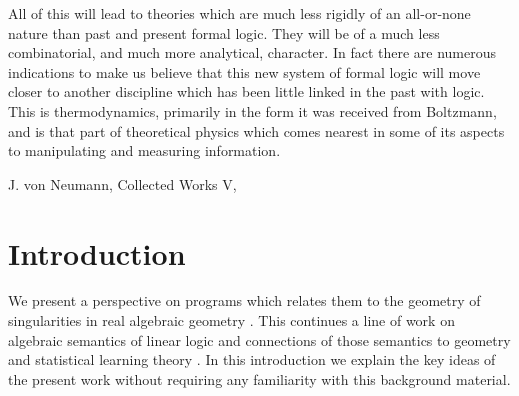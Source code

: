 \documentclass[english,letter paper,12pt,reqno]{article}
\theoremstyle{definition}
\begin{document}
\begin{abstract} We develop a correspondence between the structure of Turing machines and the structure of singularities of real analytic functions, based on connecting the Ehrhard-Regnier derivative from linear logic with the role of geometry in Watanabe's singular learning theory. The correspondence works by embedding ordinary (discrete) Turing machine codes into a family of ``noisy'' codes which form a smooth parameter space. On this parameter space we consider a potential function which has Turing machines as critical points. By relating the Taylor series expansion of this potential at such a critical point to combinatorics of error syndromes, we relate the local geometry to internal structure of the Turing machine.

The potential in question is the negative log-likelihood for a statistical model, so that the structure of the Turing machine and its associated singularity is further related to Bayesian inference. Two algorithms that produce the same predictive function can nonetheless correspond to singularities with different geometries, which implies that the Bayesian posterior can discriminate between distinct algorithmic implementations, contrary to a purely functional view of inference. In the context of singular learning theory our results point to a more nuanced understanding of Occam’s razor and the meaning of simplicity in inductive inference.
\end{abstract}

\setlength{\epigraphwidth}{0.7\textwidth}
\epigraph{All of this will lead to theories which are much less rigidly of an all-or-none nature than past and present formal logic. They will be of a much less combinatorial, and much more analytical, character. In fact there are numerous indications to make us believe that this new system of formal logic will move closer to another discipline which has been little linked in the past with logic. This is thermodynamics, primarily in the form it was received from Boltzmann, and is that part of theoretical physics which comes nearest in some of its aspects to manipulating and measuring information.}{J. von Neumann, Collected Works V, \cite[p. 304]{vonNeumann1963}}

\tableofcontents
\newpage

\section{Introduction}

We present a perspective on programs which relates them to the geometry of singularities in real algebraic geometry \cite{arnold1981singularity,greuel2007introduction,greuel2007singularity}. This continues a line of work on algebraic semantics of linear logic \cite{murfet2015sweedler,clift2020cofree,CliftMastersThesis} and connections of those semantics to geometry \cite{murfet2022eliminationcuteliminationmultiplicativelinear, troiani2025linearlogichilbertscheme} and statistical learning theory \cite{clift2021geometry,waring2021geometric}. In this introduction we explain the key ideas of the present work without requiring any familiarity with this background material.
\\
\end{document}

